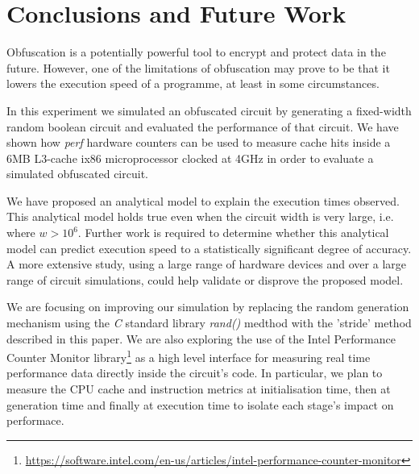 \section{Conclusions and Future Work}
Obfuscation is a potentially powerful tool to encrypt and protect data in the future. However, one of the limitations of obfuscation may prove to be that it lowers the execution speed of a programme, at least in some circumstances.
\par
In this experiment we simulated an obfuscated circuit by generating a fixed-width random boolean circuit and evaluated the performance of that circuit. We have shown how \textit{perf} hardware counters can be used to measure cache hits inside a 6MB L3-cache ix86 microprocessor clocked at 4GHz in order to evaluate a simulated obfuscated circuit.
\par
We have proposed an analytical model to explain the execution times observed. This analytical model holds true even when the circuit width is very large, i.e. where $w > 10^6$. Further work is required to determine whether this analytical model can predict execution speed to a statistically significant degree of accuracy. A more extensive study, using a large range of hardware devices and over a large range of circuit simulations, could help validate or disprove the proposed model.
\par
We are focusing on improving our simulation by replacing the random generation mechanism using the \textit{C} standard library \textit{rand()} medthod with the ’stride’ method described in this paper\cite{stride}. We are also exploring the use of the Intel Performance Counter Monitor library\footnote{\url{https://software.intel.com/en-us/articles/intel-performance-counter-monitor}} as a high level interface for measuring real time performance data directly inside the circuit's code. In particular, we plan to measure the CPU cache and instruction metrics at initialisation time, then at generation time and finally at execution time to isolate each stage's impact on performace. 

